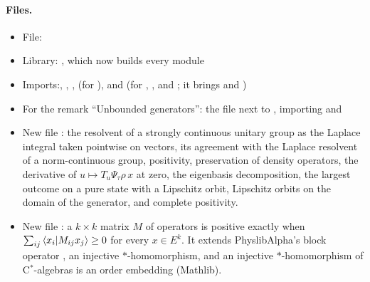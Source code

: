 \documentclass[11pt]{article}
\begin{document}
\paragraph{Files.}\leavevmode
\begin{itemize}
\item File: 
\item Library: , which now builds every module
\item Imports:\newline {},\newline
  ,\newline
  ,\newline
   (for ),\newline
  and  (for , ,
   and ; it brings  and
  )
\item For the remark ``Unbounded generators'': the file  next to
  , importing  and
\item New file : the resolvent
  of a strongly continuous unitary group as the Laplace integral taken pointwise on vectors, its
  agreement with the Laplace resolvent of a norm-continuous group, positivity, preservation of
  density operators, the derivative of $u \mapsto T_u\Psi_\tau\rho\,x$ at zero, the eigenbasis
  decomposition, the largest outcome on a pure state with a Lipschitz orbit, Lipschitz orbits
  on the domain of the generator, and complete positivity.
\item New file : a
  $k \times k$ matrix $M$ of operators is positive exactly when
  $\sum_{ij}\braket{x_i|M_{ij}x_j} \ge 0$ for every $x \in E^k$. It extends PhyslibAlpha's block
  operator , an injective $*$-homomorphism, and an injective $*$-homomorphism
  of C$^*$-algebras is an order embedding (Mathlib).

\end{itemize}
\end{document}

